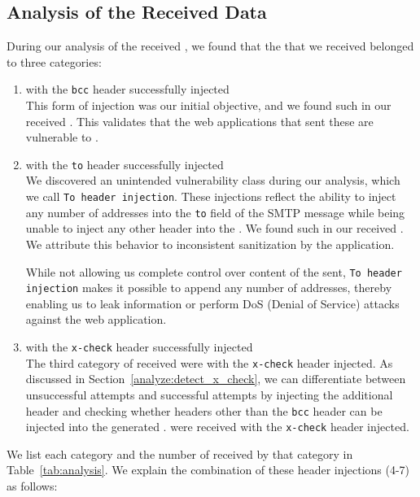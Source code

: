 \subsection{Analysis of the Received \Email Data}
During our analysis of the received \emails, we found that the \emails that we received belonged to three categories:
\begin{enumerate}
	\item \Emails with the \texttt{bcc} header successfully injected\\
	  This form of injection was our initial objective, and we found
      \ehibcc such \emails in our received \emails. This validates that the web applications that sent these \emails are vulnerable to \ehi.
	
	\item \Emails with the \texttt{to} header successfully injected\\
	We discovered an unintended vulnerability class during our analysis, which we call \texttt{To~header injection}. These injections reflect the ability to inject any number of \email addresses into the \texttt{to} field of the SMTP message while being unable to inject any other header into the \emails. We found \ehito such \emails in our received \emails. We attribute this behavior to inconsistent sanitization by the application. 
	
	While not allowing us complete control over content of the \emails sent, \texttt{To header injection} makes it possible to append any number of \email addresses, thereby enabling us to leak information or perform DoS (Denial of Service) attacks against the web application.
	
	\item \Emails with the \texttt{x-check} header successfully injected\\
    The third category of \emails received were \emails with the \texttt{x-check} header injected. As discussed in Section~\ref{analyze:detect_x_check}, 
    we can differentiate between unsuccessful attempts and successful attempts by injecting the additional header and checking whether headers other than the \texttt{bcc} header can be injected into the generated \email. \ehixcheck \emails were received with the \texttt{x-check} header injected.
\end{enumerate}

We list each category and the number of \emails received by that category in Table~\ref{tab:analysis}. 
We explain the combination of these header injections (4-7) as follows:

